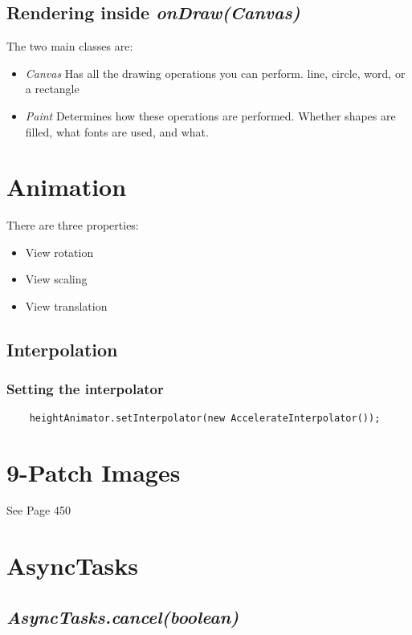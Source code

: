 \documentclass[]{article}
\renewcommand{\it}[1]{\textit{#1}}
\begin{document}
\subsection{Rendering inside \it{onDraw(Canvas)}}
The two main classes are:
\begin{itemize}
	\item \it{Canvas}
	\subitem Has all the drawing operations you can perform.
	\subitem line, circle, word, or a rectangle
	
	\item \it{Paint} 
	\subitem Determines how these operations are performed.
	\subitem Whether shapes are filled, what fonts are used, and what.
\end{itemize}

\section{Animation}
There are three properties:
\begin{itemize}
	\item View rotation
	\item View scaling
	\item View translation
\end{itemize}

\subsection{Interpolation}
\subsubsection{Setting the interpolator}
\begin{lstlisting}
	heightAnimator.setInterpolator(new AccelerateInterpolator());
\end{lstlisting}

\section{9-Patch Images}
See Page 450 

\section{AsyncTasks}
\subsection{\it{AsyncTasks.cancel(boolean)}}
\end{document}
